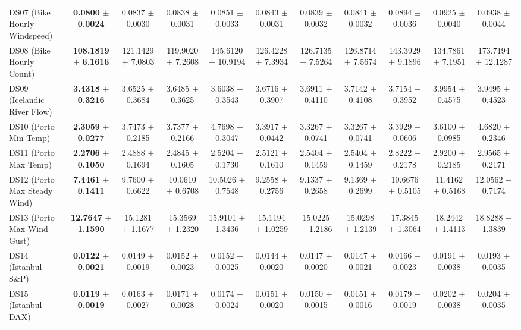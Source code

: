 \begin{table}[t]
{{\begin{tabular}{lcccccccccc}
DS07 (Bike Hourly Windspeed) & \textbf{0.0800} $\pm$ \textbf{0.0024} & 0.0837 $\pm$ 0.0030 & 0.0838 $\pm$ 0.0031 & 0.0851 $\pm$ 0.0033 & 0.0843 $\pm$ 0.0031 & 0.0839 $\pm$ 0.0032 & 0.0841 $\pm$ 0.0032 & 0.0894 $\pm$ 0.0036 & 0.0925 $\pm$ 0.0040 & 0.0938 $\pm$ 0.0044 \\
DS08 (Bike Hourly Count) & \textbf{108.1819} $\pm$ \textbf{6.1616} & 121.1429 $\pm$ 7.0803 & 119.9020 $\pm$ 7.2608 & 145.6120 $\pm$ 10.9194 & 126.4228 $\pm$ 7.3934 & 126.7135 $\pm$ 7.5264 & 126.8714 $\pm$ 7.5674 & 143.3929 $\pm$ 9.1896 & 134.7861 $\pm$ 7.1951 & 173.7194 $\pm$ 12.1287 \\
DS09 (Icelandic River Flow) & \textbf{3.4318} $\pm$ \textbf{0.3216} & 3.6525 $\pm$ 0.3684 & 3.6485 $\pm$ 0.3625 & 3.6038 $\pm$ 0.3543 & 3.6716 $\pm$ 0.3907 & 3.6911 $\pm$ 0.4110 & 3.7142 $\pm$ 0.4108 & 3.7154 $\pm$ 0.3952 & 3.9954 $\pm$ 0.4575 & 3.9495 $\pm$ 0.4523 \\
DS10 (Porto Min Temp) & \textbf{2.3059} $\pm$ \textbf{0.0277} & 3.7473 $\pm$ 0.2185 & 3.7377 $\pm$ 0.2166 & 4.7698 $\pm$ 0.3047 & 3.3917 $\pm$ 0.0442 & 3.3267 $\pm$ 0.0741 & 3.3267 $\pm$ 0.0741 & 3.3929 $\pm$ 0.0606 & 3.6100 $\pm$ 0.0985 & 4.6820 $\pm$ 0.2346 \\
DS11 (Porto Max Temp) & \textbf{2.2706} $\pm$ \textbf{0.1050} & 2.4888 $\pm$ 0.1694 & 2.4845 $\pm$ 0.1605 & 2.5204 $\pm$ 0.1730 & 2.5121 $\pm$ 0.1610 & 2.5404 $\pm$ 0.1459 & 2.5404 $\pm$ 0.1459 & 2.8222 $\pm$ 0.2178 & 2.9200 $\pm$ 0.2185 & 2.9565 $\pm$ 0.2171 \\
DS12 (Porto Max Steady Wind) & \textbf{7.4461} $\pm$ \textbf{0.1411} & 9.7600 $\pm$ 0.6622 & 10.0610 $\pm$ 0.6708 & 10.5026 $\pm$ 0.7548 & 9.2558 $\pm$ 0.2756 & 9.1337 $\pm$ 0.2658 & 9.1369 $\pm$ 0.2699 & 10.6676 $\pm$ 0.5105 & 11.4162 $\pm$ 0.5168 & 12.0562 $\pm$ 0.7174 \\
DS13 (Porto Max Wind Gust) & \textbf{12.7647} $\pm$ \textbf{1.1590} & 15.1281 $\pm$ 1.1677 & 15.3569 $\pm$ 1.2320 & 15.9101 $\pm$ 1.3436 & 15.1194 $\pm$ 1.0259 & 15.0225 $\pm$ 1.2186 & 15.0298 $\pm$ 1.2139 & 17.3845 $\pm$ 1.3064 & 18.2442 $\pm$ 1.4113 & 18.8288 $\pm$ 1.3839 \\
DS14 (Istanbul S\&P) & \textbf{0.0122} $\pm$ \textbf{0.0021} & 0.0149 $\pm$ 0.0019 & 0.0152 $\pm$ 0.0023 & 0.0152 $\pm$ 0.0025 & 0.0144 $\pm$ 0.0020 & 0.0147 $\pm$ 0.0020 & 0.0147 $\pm$ 0.0021 & 0.0166 $\pm$ 0.0023 & 0.0191 $\pm$ 0.0038 & 0.0193 $\pm$ 0.0035 \\
DS15 (Istanbul DAX) & \textbf{0.0119} $\pm$ \textbf{0.0019} & 0.0163 $\pm$ 0.0027 & 0.0171 $\pm$ 0.0028 & 0.0174 $\pm$ 0.0024 & 0.0151 $\pm$ 0.0020 & 0.0150 $\pm$ 0.0015 & 0.0151 $\pm$ 0.0016 & 0.0179 $\pm$ 0.0019 & 0.0202 $\pm$ 0.0038 & 0.0204 $\pm$ 0.0035 \\

\end{tabular}}}
\end{table}
